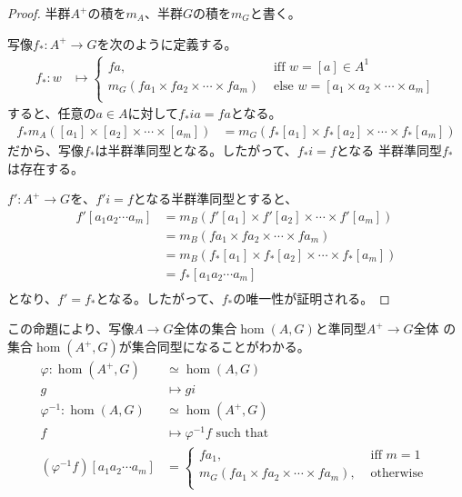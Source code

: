 	\begin{proof}
		半群$A^+$の積を$m_A$、半群$G$の積を$m_G$と書く。
		
		写像$f_*:A^+\to G$を次のように定義する。
		\begin{equation*}\begin{split}
			f_*: w &\mapsto \begin{cases}
				fa, &\text{ iff }w = [a] \in A^1 \\
				m_G(fa_1\times fa_2\times \cdots \times fa_m)
					&\text{ else }w = [a_1\times a_2\times \cdots \times a_m] \\
				\end{cases}
		\end{split}\end{equation*}
		すると、任意の$a\in A$に対して$f_*ia=fa$となる。
		\begin{equation*}\begin{split}
			f_*m_A([a_1] \times [a_2] \times \cdots \times [a_m])
				&= m_G(f_*[a_1]\times f_*[a_2]\times \cdots \times f_*[a_m]) 
		\end{split}\end{equation*}
		だから、写像$f_*$は半群準同型となる。したがって、$f_*i=f$となる
		半群準同型$f_*$は存在する。

		$f':A^+\to G$を、$f'i=f$となる半群準同型とすると、
		\begin{equation*}\begin{split}
			f'[a_1a_2\cdots a_m] &= m_B(f'[a_1]\times f'[a_2]\times \cdots \times f'[a_m]) \\
				&= m_B(fa_1\times fa_2\times \cdots \times fa_m) \\
				&= m_B(f_*[a_1]\times f_*[a_2]\times \cdots \times f_*[a_m]) \\
				&= f_*[a_1a_2\cdots a_m] \\
		\end{split}\end{equation*}
		となり、$f'=f_*$となる。したがって、$f_*$の唯一性が証明される。
	\end{proof}

	この命題により、写像$A\to G$全体の集合$\hom(A,G)$と準同型$A^+\to G$全体
	の集合$\hom(A^+,G)$が集合同型になることがわかる。
	\begin{equation}\begin{split} %
		\varphi: \hom(A^+,G) &\simeq \hom(A,G) \\
			g &\mapsto gi \\
		\varphi^{-1}: \hom(A,G) &\simeq \hom(A^+,G) \\
			f &\mapsto \varphi^{-1}f \text{ such that } \\
			(\varphi^{-1}f)[a_1a_2\cdots a_m] &= \begin{cases}
				fa_1, &\text{ iff } m=1 \\
				m_G(fa_1\times fa_2\times \cdots\times fa_m), &\text{ otherwise } \\
				\end{cases}
	\end{split}\end{equation} %

